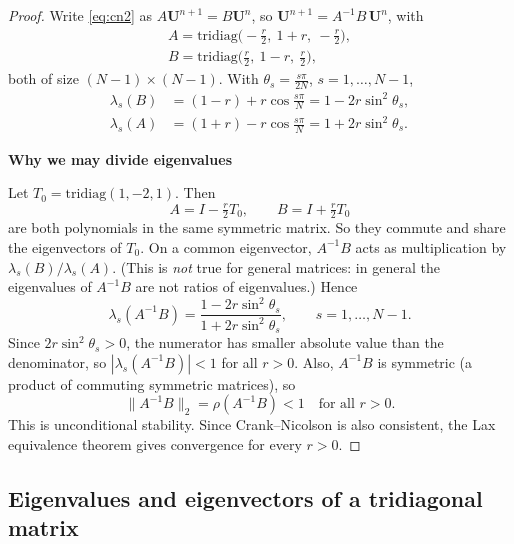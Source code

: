 \documentclass[11pt,a4paper]{article}
\numberwithin{equation}{section}
\theoremstyle{spacedplain}
\theoremstyle{spaceddefinition}
\theoremstyle{spacedremark}
\newcommand{\step}[1]{\par\addvspace{0.6em}\noindent\textbf{#1}\par\nobreak}
\begin{document}
\begin{proof}
Write \eqref{eq:cn2} as \(A\mathbf U^{n+1}=B\mathbf U^n\), so
\(\mathbf U^{n+1}=A^{-1}B\,\mathbf U^n\), with
\[
\begin{gathered}
  A=\mathrm{tridiag}\bigl(-\tfrac r2,\ 1+r,\ -\tfrac r2\bigr),
  \\
  B=\mathrm{tridiag}\bigl(\tfrac r2,\ 1-r,\ \tfrac r2\bigr),
\end{gathered}
\]
both of size \((N-1)\times(N-1)\).  With \(\theta_s=\frac{s\pi}{2N}\),
\(s=1,\dots,N-1\),
\begin{align*}
  \lambda_s(B)&=(1-r)+r\cos\frac{s\pi}N=1-2r\sin^2\theta_s,\\
  \lambda_s(A)&=(1+r)-r\cos\frac{s\pi}N=1+2r\sin^2\theta_s.
\end{align*}

\step{Why we may divide eigenvalues}
Let
\(T_0=\mathrm{tridiag}(1,-2,1)\).  Then
\[
  A=I-\tfrac r2T_0,\qquad B=I+\tfrac r2T_0
\]
are both polynomials in the same symmetric matrix.  So they commute and
share the eigenvectors of \(T_0\).  On a common eigenvector,
\(A^{-1}B\) acts as multiplication by \(\lambda_s(B)/\lambda_s(A)\).
(This is \emph{not} true for general matrices: in general the
eigenvalues of \(A^{-1}B\) are not ratios of eigenvalues.)  Hence
\[
  \boxed{\lambda_s(A^{-1}B)=\frac{1-2r\sin^2\theta_s}{1+2r\sin^2\theta_s}},
  \qquad s=1,\dots,N-1.
\]
Since \(2r\sin^2\theta_s>0\), the numerator has smaller absolute value
than the denominator, so \(|\lambda_s(A^{-1}B)|<1\) for all \(r>0\).
Also, \(A^{-1}B\) is symmetric (a product of commuting symmetric
matrices), so
\[
  \|A^{-1}B\|_2=\rho(A^{-1}B)<1\quad\text{for all } r>0 .
\]
This is unconditional stability.  Since Crank--Nicolson is also
consistent, the Lax equivalence theorem gives convergence for every
\(r>0\).
\end{proof}

\subsection{Eigenvalues and eigenvectors of a tridiagonal
matrix}\label{sec:tridiag}
\end{document}
